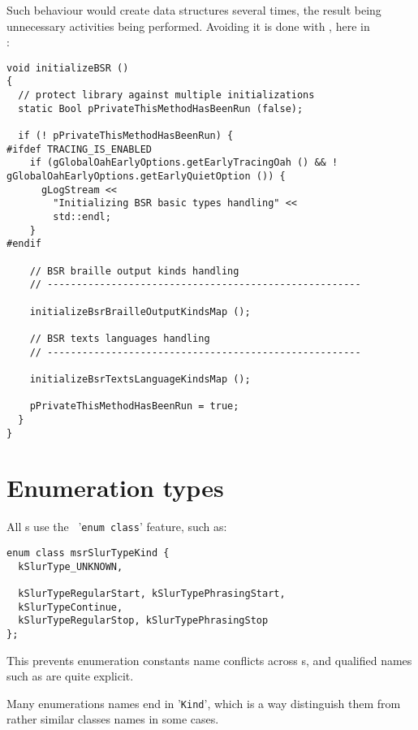 Such behaviour would create data structures several times, the result being unnecessary activities being performed. Avoiding it is done with , here in \\
:
\begin{lstlisting}[language=CPlusPlus]
void initializeBSR ()
{
  // protect library against multiple initializations
  static Bool pPrivateThisMethodHasBeenRun (false);

  if (! pPrivateThisMethodHasBeenRun) {
#ifdef TRACING_IS_ENABLED
    if (gGlobalOahEarlyOptions.getEarlyTracingOah () && ! gGlobalOahEarlyOptions.getEarlyQuietOption ()) {
      gLogStream <<
        "Initializing BSR basic types handling" <<
        std::endl;
    }
#endif

    // BSR braille output kinds handling
    // ------------------------------------------------------

    initializeBsrBrailleOutputKindsMap ();

    // BSR texts languages handling
    // ------------------------------------------------------

    initializeBsrTextsLanguageKindsMap ();

    pPrivateThisMethodHasBeenRun = true;
  }
}
\end{lstlisting}


\section{Enumeration types}

All \enumType s use the \CPlusplus\ '{\tt enum class}' feature, such as:

\begin{lstlisting}[language=CPlusPlus]
enum class msrSlurTypeKind {
  kSlurType_UNKNOWN,

  kSlurTypeRegularStart, kSlurTypePhrasingStart,
  kSlurTypeContinue,
  kSlurTypeRegularStop, kSlurTypePhrasingStop
};
\end{lstlisting}

This prevents enumeration constants name conflicts across \enumType s, and qualified names such as  are quite explicit.

Many enumerations names end in '{\tt Kind}', which is a way distinguish them from rather similar classes names in some cases.

